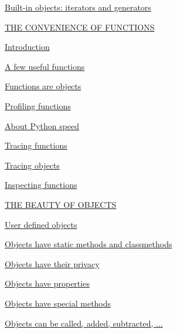 \documentclass[10pt,english]{article}
\begin{document}
\begin{list}{}{}
\begin{list}{}{}
\item {} \href{\#built-in-objects-iterators-and-generators}{Built-in objects: iterators and generators}

\end{list}

\item {} \href{\#the-convenience-of-functions}{THE CONVENIENCE OF FUNCTIONS}
\begin{list}{}{}
\item {} \href{\#id16}{Introduction}

\item {} \href{\#a-few-useful-functions}{A few useful functions}

\item {} \href{\#functions-are-objects}{Functions are objects}

\item {} \href{\#profiling-functions}{Profiling functions}

\item {} \href{\#about-python-speed}{About Python speed}

\item {} \href{\#tracing-functions}{Tracing functions}

\item {} \href{\#tracing-objects}{Tracing objects}

\item {} \href{\#inspecting-functions}{Inspecting functions}

\end{list}

\item {} \href{\#the-beauty-of-objects}{THE BEAUTY OF OBJECTS}
\begin{list}{}{}
\item {} \href{\#user-defined-objects}{User defined objects}

\item {} \href{\#objects-have-static-methods-and-classmethods}{Objects have static methods and classmethods}

\item {} \href{\#objects-have-their-privacy}{Objects have their privacy}

\item {} \href{\#objects-have-properties}{Objects have properties}

\item {} \href{\#objects-have-special-methods}{Objects have special methods}

\item {} \href{\#objects-can-be-called-added-subtracted}{Objects can be called, added, subtracted, ...}


\end{list}
\end{list}
\end{document}
